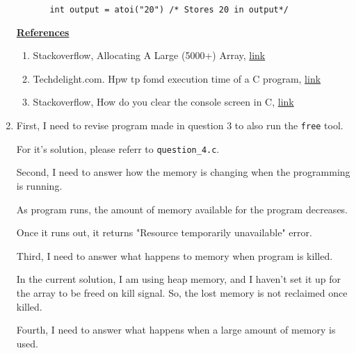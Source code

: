\documentclass[12pt]{article}
\begin{document}
\begin{enumerate}[1.]
\begin{itemize}
\begin{itemize}
            \texttt{int output = atoi("20") /* Stores 20 in output*/}
        \end{itemize}
    \end{itemize}

    \bigskip

    \underline{\textbf{References}}

    \bigskip

    \begin{enumerate}[1)]
        \item Stackoverflow, Allocating A Large (5000+) Array, \href{https://stackoverflow.com/questions/5746377/allocating-a-large-5000-array}{link}
        \item Techdelight.com. Hpw tp fomd execution time of a C program, \href{https://www.techiedelight.com/find-execution-time-c-program/}{link}
        \item Stackoverflow, How do you clear the console screen in C, \href{https://stackoverflow.com/questions/2347770/how-do-you-clear-the-console-screen-in-c}{link}
    \end{enumerate}

    \item

    First, I need to revise program made in question 3 to also run the \texttt{free}
    tool.

    \bigskip

    For it's solution, please referr to \texttt{question\_4.c}.

    \bigskip

    Second, I need to answer how the memory is changing when the programming is running.

    \bigskip

    As program runs, the amount of memory available for the program decreases.

    \bigskip

    Once it runs out, it returns "Resource temporarily unavailable" error.

    \bigskip

    Third, I need to answer what happens to memory when program is killed.

    \bigskip

    In the current solution, I am using heap memory, and I haven't set it up
    for the array to be freed on kill signal. So, the lost memory is not reclaimed once killed.

    \bigskip

    Fourth, I need to answer what happens when a large amount of memory is used.


\end{enumerate}
\end{document}
